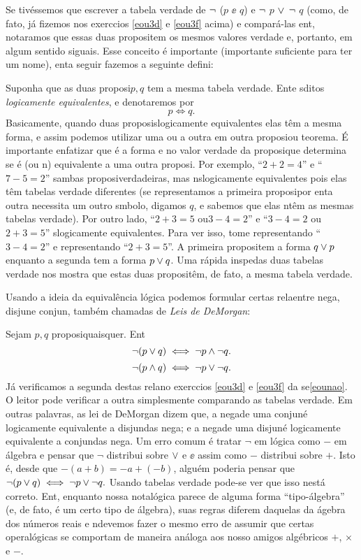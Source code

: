 Se tiv\'essemos que escrever a tabela verdade de $\lnot$ ($p$ $\ee$ $q$) e $\lnot$ $p$ $\vee$ $\lnot$ $q$ (como, de fato, j\'a fizemos nos exerc\ih cios \ref{eou3d} e \ref{eou3f} acima) e compar\'a-las ent\aoi, notar\ih amos que essas duas proposi\coes tem os mesmos valores verdade e, portanto, em algum sentido s\ao iguais. Esse conceito \'e importante (importante suficiente para ter um nome), ent\ao a seguir fazemos a seguinte defini\caoi:

Suponha que as duas proposi\coes $p,q$ tem a mesma tabela verdade. Ent\ao \pp e \qq s\ao ditos {\it logicamente equivalentes}, e denotaremos por
\[
p \iff q.
\] 
Basicamente, quando duas proposi\coes s\ao logicamente equivalentes elas t\^em a mesma forma, e assim podemos utilizar uma ou a outra em outra proposi\cao ou teorema. \'E importante enfatizar que \'e a forma e n\ao o valor verdade da proposi\cao que determina se \'e (ou n\aoi) equivalente a uma outra proposi\caoi. Por exemplo, ``$2+2=4$'' e ``$7-5=2$'' s\ao ambas proposi\coes verdadeiras, mas n\ao s\ao logicamente equivalentes pois elas t\^em tabelas verdade diferentes (se representamos a primeira proposi\cao por \pp ent\ao a outra necessita um outro s\ih mbolo, digamos $q$, e sabemos que elas n\ao t\^em as mesmas tabelas verdade). Por outro lado, ``$2+3=5$ ou$3-4=2$'' e ``$3-4=2$ ou $2+3=5$'' s\ao logicamente equivalentes. Para ver isso, tome \pp representando ``$3-4=2$'' e \qq representando ``$2+3=5$''. A primeira proposi\cao tem a forma $q\vee p$ enquanto a segunda tem a forma $p\vee q$. Uma r\'apida inspe\cao das duas tabelas verdade nos mostra que estas duas proposi\coes t\^em, de fato, a mesma tabela verdade.

Usando a ideia da equival\^encia l\'ogica podemos formular certas rela\coes entre nega\caoi, disjun\cao e conjun\caoi, tamb\'em chamadas de {\it Leis de DeMorgan}:

Sejam $p,q$ proposi\coes quaisquer. Ent\ao
\[
\lnot (p \vee q) \iff \lnot p \wedge \lnot q.
\]
\[
\lnot (p \wedge q) \iff \lnot p \vee \lnot q.
\]
J\'a verificamos a segunda destas rela\coes no exerc\ih cios \ref{eou3d} e \ref{eou3f} da se\cao \ref{eounao}. O leitor pode verificar a outra simplesmente comparando as tabelas verdade. Em outras palavras, as lei de DeMorgan dizem que, a nega\cao de uma conjun\cao \'e logicamente equivalente a disjun\cao das nega\cois; e a nega\cao de uma disjun\cao \'e logicamente equivalente a conjun\cao das nega\cois . Um erro comum \'e tratar $\lnot$ em l\'ogica como $-$ em \'algebra e pensar que $\lnot$ distribui sobre $\vee$ e $\ee$ assim  como $-$ distribui sobre $+$. Isto \'e, desde que $-(a+b)=-a+(-b)$, algu\'em poderia pensar que $\lnot (p \vee q) \iff \lnot p \vee \lnot q.$ Usando tabelas verdade pode-se ver que isso n\ao est\'a correto. Ent\aoi, enquanto nossa nota\cao l\'ogica parece de alguma forma ``tipo-\'algebra'' (e, de fato, \'e um certo tipo de \'algebra), suas regras diferem daquelas da \'agebra dos n\'umeros reais e n\ao devemos fazer o mesmo erro de assumir que certas opera\coes l\'ogicas se comportam de maneira an\'aloga aos nosso amigos alg\'ebricos $+$, $\times$ e $-$.

